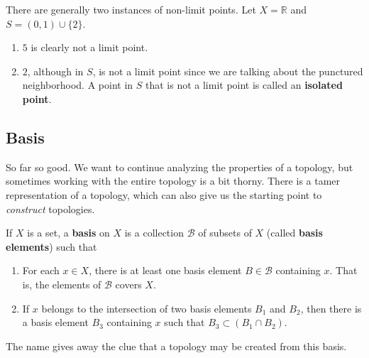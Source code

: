 \documentclass{article}
\begin{document}
    \begin{example}
      There are generally two instances of non-limit points. Let $X = \mathbb{R}$ and $S = (0, 1) \cup \{2\}$. 
      \begin{enumerate}
        \item $5$ is clearly not a limit point. 
        \item $2$, although in $S$, is not a limit point since we are talking about the punctured neighborhood. A point in $S$ that is not a limit point is called an \textbf{isolated point}. 
      \end{enumerate}
    \end{example}

  \subsection{Basis} 

    So far so good. We want to continue analyzing the properties of a topology, but sometimes working with the entire topology is a bit thorny. There is a tamer representation of a topology, which can also give us the starting point to \textit{construct} topologies. 

    \begin{definition}[Basis]
      If $X$ is a set, a \textbf{basis} on $X$ is a collection $\mathscr{B}$ of subsets of $X$ (called \textbf{basis elements}) such that
      \begin{enumerate}
        \item For each $x \in X$, there is at least one basis element $B \in \mathscr{B}$ containing $x$. That is, the elements of $\mathscr{B}$ covers $X$. 
        \item If $x$ belongs to the intersection of two basis elements $B_1$ and $B_2$, then there is a basis element $B_3$ containing $x$ such that $B_3 \subset (B_1 \cap B_2)$. 
      \end{enumerate}
    \end{definition} 

    The name gives away the clue that a topology may be created from this basis.  
\end{document}
